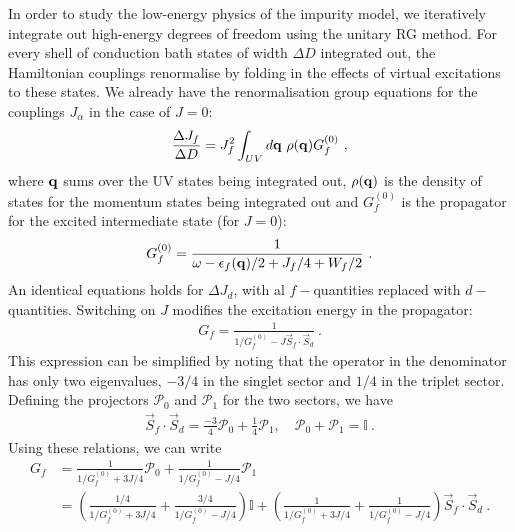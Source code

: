 \documentclass[%
reprint,
superscriptaddress,
groupedaddress,
superscriptaddress,
onecolumn,
10pt
]{revtex4-2}
\begin{document}
In order to study the low-energy physics of the impurity model, we iteratively integrate out high-energy degrees of freedom using the unitary RG method. For every shell of conduction bath states of width \(\Delta D\) integrated out, the Hamiltonian couplings renormalise by folding in the effects of virtual excitations to these states. We already have the renormalisation group equations for the couplings \(J_\alpha\) in the case of \(J=0\):
\begin{equation}\begin{aligned}
	\frac{\Delta J_f}{\Delta D} = J_f^2 \int_{UV} d{\bf q} ~\rho({\bf q}) G_f^{(0)}~,
\end{aligned}\end{equation}
where \({\bf q}\) sums over the UV states being integrated out, \(\rho({\bf q})\) is the density of states for the momentum states being integrated out and \(G_f^{(0)}\) is the propagator for the excited intermediate state (for \(J=0\)):
\begin{equation}\begin{aligned}
	G_f^{(0)} = \frac{1}{\omega - \epsilon_f({\bf q}) / 2 + J_f / 4 + W_f / 2}~.
\end{aligned}\end{equation}
An identical equations holds for \(\Delta J_d\), with al \(f-\)quantities replaced with \(d-\)quantities. Switching on \(J\) modifies the excitation energy in the propagator:
\begin{equation}\begin{aligned}
	G_f = \frac{1}{1/G_f^{(0)} - J \vec{S}_f\cdot\vec{S}_d}~.
\end{aligned}\end{equation}
This expression can be simplified by noting that the operator in the denominator has only two eigenvalues, \(-3/4\) in the singlet sector and \(1/4\) in the triplet sector. Defining the projectors \(\mathcal{P}_0\) and \(\mathcal{P}_1\) for the two sectors, we have
\begin{equation}\begin{aligned}
	\vec{S}_f\cdot\vec{S}_d = \frac{-3}{4}\mathcal{P}_0 + \frac{1}{4}\mathcal{P}_1, \quad \mathcal{P}_0 + \mathcal{P}_1 = \mathbb{I}~.
\end{aligned}\end{equation}
Using these relations, we can write
\begin{equation}\begin{aligned}
	G_f &= \frac{1}{1/G_f^{(0)} + 3J/4}\mathcal{P}_0 + \frac{1}{1/G_f^{(0)} - J/4}\mathcal{P}_1 \\
		&= \left(\frac{1/4}{1/G_f^{(0)} + 3J/4} + \frac{3/4}{1/G_f^{(0)} - J/4}\right)\mathbb{I} + \left(\frac{1}{1/G_f^{(0)} + 3J/4} + \frac{1}{1/G_f^{(0)} - J/4}\right)\vec{S}_f\cdot\vec{S}_d~.
\end{aligned}\end{equation}
\end{document}
